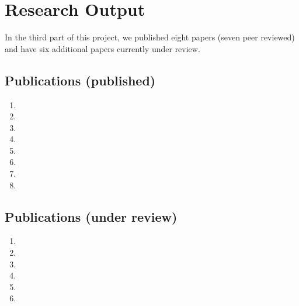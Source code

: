 \documentclass[11pt, manuscript,\review anonymous]{acmart}
\begin{document}
\section{Research Output}

In the third part of this project, we published eight papers (seven peer
reviewed) and have six additional papers currently under review.

\subsection{Publications (published)}
\begin{enumerate}
	\item {}
	\item {}
	\item {}
	\item {}
	\item {}
	\item {}
	\item {}
	\item {}
\end{enumerate}
\subsection{Publications (under review)}
\begin{enumerate}
	\item {}
	\item {}
	\item {}
	\item {}
	\item {}
	\item {}
\end{enumerate}


\end{document}
